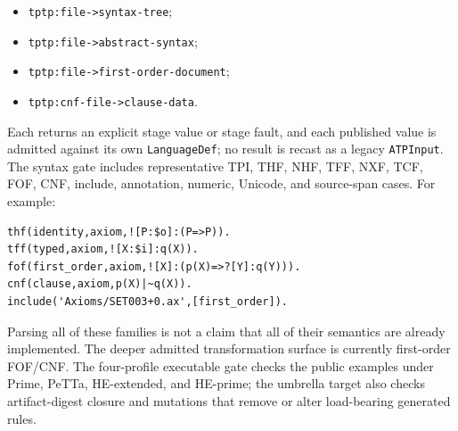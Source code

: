 \documentclass[11pt]{article}
\newcommand{\code}[1]{\texttt{#1}}
\begin{document}
\begin{itemize}
\item \code{tptp:file->syntax-tree};
\item \code{tptp:file->abstract-syntax};
\item \code{tptp:file->first-order-document};
\item \code{tptp:cnf-file->clause-data}.
\end{itemize}

Each returns an explicit stage value or stage fault, and each published value
is admitted against its own \code{LanguageDef}; no result is recast as a
legacy \code{ATPInput}.  The syntax gate includes representative TPI, THF,
NHF, TFF, NXF, TCF, FOF, CNF, include, annotation, numeric, Unicode, and
source-span cases.  For example:

\begin{lstlisting}[language={},caption={Representative inputs accepted by the versioned TPTP grammar}]
thf(identity,axiom,![P:$o]:(P=>P)).
tff(typed,axiom,![X:$i]:q(X)).
fof(first_order,axiom,![X]:(p(X)=>?[Y]:q(Y))).
cnf(clause,axiom,p(X)|~q(X)).
include('Axioms/SET003+0.ax',[first_order]).
\end{lstlisting}

\noindent
Parsing all of these families is not a claim that all of their semantics are
already implemented.  The deeper admitted transformation surface is
currently first-order FOF/CNF.  The four-profile executable gate checks the
public examples under Prime, PeTTa, HE-extended, and HE-prime; the umbrella
target also checks artifact-digest closure and mutations that remove or alter
load-bearing generated rules.
\end{document}
